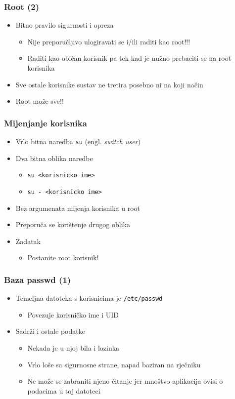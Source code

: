 \documentclass{beamer}
\newcommand{\shell}[1]{\texttt{#1}}
\begin{document}
\begin{frame}[t]
\frametitle{Root (2)} 
\begin{itemize}
  \item Bitno pravilo sigurnosti i opreza
  \begin{itemize}
    \item Nije preporučljivo ulogiravati se i/ili raditi kao root!!!
    \item Raditi kao običan korisnik pa tek kad je nužno prebaciti se na 
          root korisnika
  \end{itemize}
  \item Sve ostale korisnike sustav ne tretira posebno ni na koji način
  \item Root može sve!!
\end{itemize}
\end{frame}

\begin{frame}[t]
\frametitle{Mijenjanje korisnika} 
\begin{itemize}
  \item Vrlo bitna naredba \shell{su} (engl. \emph{switch user})
  \item Dva bitna oblika naredbe
  \begin{itemize}
    \item \shell{su <korisnicko ime>}
    \item \shell{su - <korisnicko ime>}
  \end{itemize}
  \item Bez argumenata mijenja korisnika u root
  \item Preporuča se korištenje drugog oblika
  \item Zadatak
  \begin{itemize}
    \item Postanite root korisnik!
  \end{itemize}
\end{itemize}
\end{frame}

\begin{frame}[t]
\frametitle{Baza passwd (1)} 
\begin{itemize}
  \item Temeljna datoteka s korisnicima je \shell{/etc/passwd}
  \begin{itemize} 
    \item Povezuje korisničko ime i UID
  \end{itemize}
  \item Sadrži i ostale podatke
  \begin{itemize}
    \item Nekada je u njoj bila i lozinka
    \item Vrlo loše sa sigurnosne strane, napad baziran na rječniku
    \item Ne može se zabraniti njeno čitanje jer mnoštvo aplikacija ovisi 
          o podacima u toj datoteci
  \end{itemize}
\end{itemize}
\end{frame}
\end{document}

